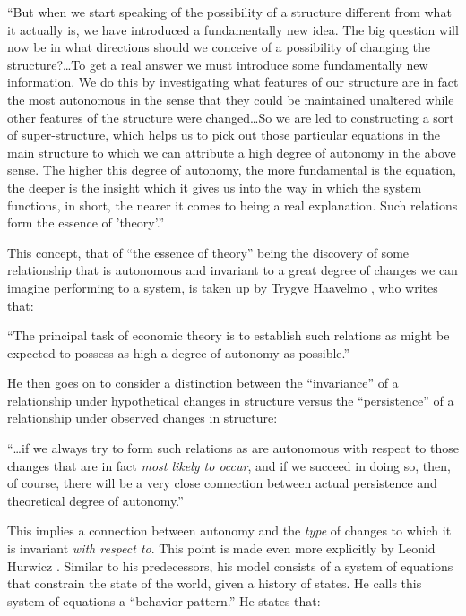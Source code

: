 \documentclass[a4paper,12pt]{article}
\begin{document}
\begin{displayquote}
``But when we start speaking of the possibility of a structure different from what it actually is, we have introduced a fundamentally new idea. The big question will now be in what directions should we conceive of a possibility of changing the structure?\ldots To get a real answer we must introduce some fundamentally new information. We do this by investigating what features of our structure are in fact the most autonomous in the sense that they could be maintained unaltered while other features of the structure were changed\ldots So we are led to constructing a sort of super-structure, which helps us to pick out those particular equations in the main structure to which we can attribute a high degree of autonomy in the above sense. The higher this degree of autonomy, the more fundamental is the equation, the deeper is the insight which it gives us into the way in which the system functions, in short, the nearer it comes to being a real explanation. Such relations form the essence of 'theory'.''
\end{displayquote}

This concept, that of ``the essence of theory'' being the discovery of some relationship that is autonomous and invariant to a great degree of changes we can imagine performing to a system, is taken up by Trygve Haavelmo \parencite*{Haavelmo1944}, who writes that: 

\begin{displayquote}
``The principal task of economic theory is to establish such relations as might be expected to possess as high a degree of autonomy as possible.''  
\end{displayquote}

He then goes on to consider a distinction between the ``invariance'' of a relationship under hypothetical changes in structure versus the ``persistence'' of a relationship under observed changes in structure:

\begin{displayquote}
``\ldots if we always try to form such relations as are autonomous with respect to those changes that are in fact \textit{most likely to occur}, and if we succeed in doing so, then, of course, there will be a very close connection between actual persistence and theoretical degree of autonomy.''
\end{displayquote}

This implies a connection between autonomy and the \textit{type} of changes to which it is invariant \textit{with respect to}. This point is made even more explicitly by Leonid Hurwicz \parencite*{Hurwicz1966}. Similar to his predecessors, his model consists of a system of equations that constrain the state of the world, given a history of states. He calls this system of equations a ``behavior pattern.'' He states that: 
\end{document}
